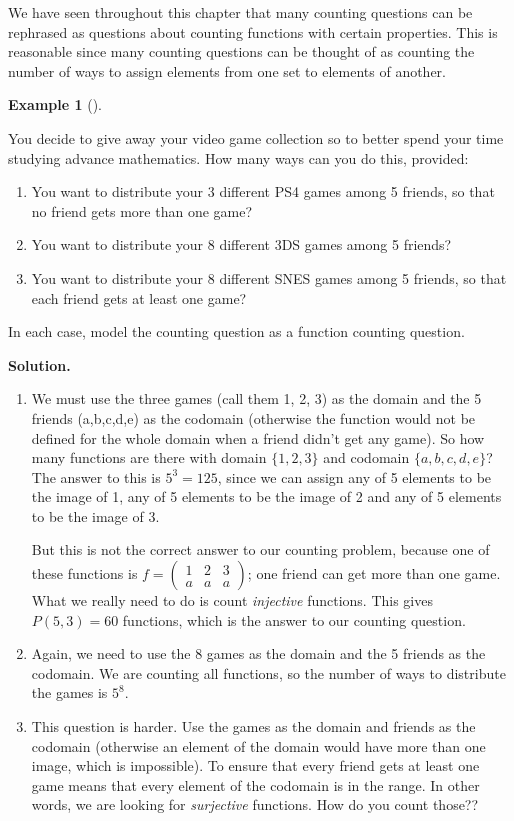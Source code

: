 \documentclass[10pt,]{book}
\theoremstyle{plain}
\theoremstyle{definition}
\newtheorem{example}[theorem]{Example}
\theoremstyle{definition}
\theoremstyle{definition}
\numberwithin{equation}{chapter}
\newcommand{\twoline}[2]{\begin{pmatrix}#1 \\ #2 \end{pmatrix}}
\newcommand{\amp}{ & }
\begin{document}
      We have seen throughout this chapter that many counting questions can be rephrased as questions about counting functions with certain properties.  This is reasonable since many counting questions can be thought of as counting the number of ways to assign elements from one set to elements of another.
\begin{example}[]\label{example-51}

    You decide to give away your video game collection so to better spend your time studying advance mathematics. How many ways can you do this, provided:
      \leavevmode%
\begin{enumerate}
\item\hypertarget{li-629}{}You want to distribute your 3 different PS4 games among 5 friends, so that no friend gets more than one game?%
\item\hypertarget{li-630}{}You want to distribute your 8 different 3DS games among 5 friends?%
\item\hypertarget{li-631}{}You want to distribute your 8 different SNES games among 5 friends, so that each friend gets at least one game?%
\end{enumerate}

      In each case, model the counting question as a function counting question.
\par\medskip\noindent%
\textbf{Solution.}\quad
      \leavevmode%
\begin{enumerate}
\item\hypertarget{li-632}{}We must use the three games (call them 1, 2, 3) as the domain and the 5 friends (a,b,c,d,e) as the codomain (otherwise the function would not be defined for the whole domain when a friend didn't get any game).  So how many functions are there with domain \(\{1,2,3\}\) and codomain \(\{a,b,c,d,e\}\)?  The answer to this is \(5^3=125\), since we can assign any of 5 elements to be the image of 1, any of 5 elements to be the image of 2 and any of 5 elements to be the image of 3.%
\par

          But this is not the correct answer to our counting problem, because one of these functions is \(f= \twoline{1\amp 2\amp 3}{a\amp a\amp a}\); one friend can get more than one game.  What we really need to do is count \emph{injective} functions.  This gives \(P(5,3) = 60\) functions, which is the answer to our counting question.
\item\hypertarget{li-633}{}
        Again, we need to use the 8 games as the domain and the 5 friends as the codomain.  We are counting all functions, so the number of ways to distribute the games is \(5^8\).
\item\hypertarget{li-634}{}
        This question is harder.  Use the games as the domain and friends as the codomain (otherwise an element of the domain would have more than one image, which is impossible).  To ensure that every friend gets at least one game means that every element of the codomain is in the range.  In other words, we are looking for \emph{surjective} functions. How do you count those??
\end{enumerate}


%
\end{example}
\end{document}
